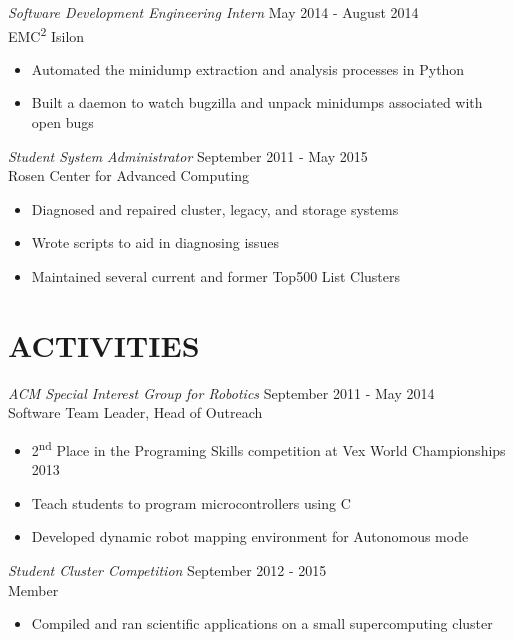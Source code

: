\documentclass[line,margin]{res}
\begin{document}
\begin{resume}
    {\sl Software Development Engineering Intern} \hfill May 2014 - August 2014 \\
      EMC\textsuperscript{2} Isilon
      \begin{itemize}  \itemsep -2pt
        \item Automated the minidump extraction and analysis processes in Python
        \item Built a daemon to watch bugzilla and unpack minidumps associated with open bugs
      \end{itemize}

    {\sl Student System Administrator} \hfill September 2011 - May 2015 \\
      Rosen Center for Advanced Computing
      \begin{itemize}  \itemsep -2pt %
        \item Diagnosed and repaired cluster, legacy, and storage systems
        \item Wrote scripts to aid in diagnosing issues
        \item Maintained several current and former Top500 List Clusters
      \end{itemize}

  \section{\textcolor{TealBlue}{ACTIVITIES}}
    {\sl ACM Special Interest Group for Robotics} \hfill September 2011 - May 2014 \\
      Software Team Leader, Head of Outreach
      \begin{itemize}  \itemsep -2pt %
        \item 2\textsuperscript{nd} Place in the Programing Skills competition at Vex World Championships 2013
        \item Teach students to program microcontrollers using C
        \item Developed dynamic robot mapping environment for Autonomous mode
      \end{itemize}
    
    {\sl Student Cluster Competition} \hfill September 2012 - 2015 \\
      Member
      \begin{itemize}  \itemsep -2pt %
        \item Compiled and ran scientific applications on a small supercomputing cluster
      \end{itemize}
  

\end{resume}
\end{document}
